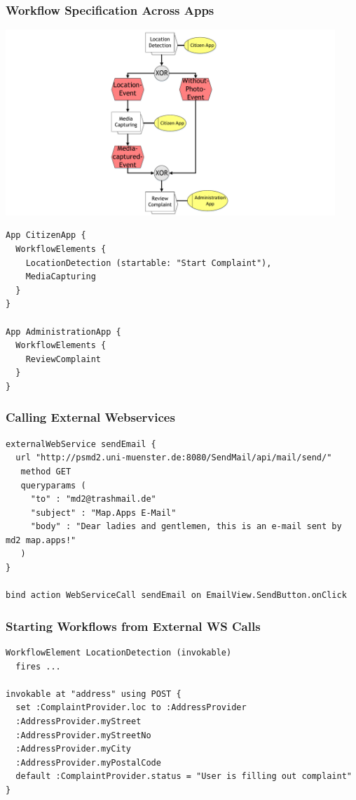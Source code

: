 \begin{frame}
	\plainnumber
	\frametitle{Workflow Specification Across Apps}
	
	\begin{minipage}{0.45\textwidth}
	    		        \includegraphics[height = 7cm, trim = 10cm 0cm 10cm 0cm, clip = true]{images/wfAcrossApps}	  
	\end{minipage}\hfill
	\begin{minipage}{0.5\textwidth}
\begin{lstlisting}
App CitizenApp {
  WorkflowElements {
    LocationDetection (startable: "Start Complaint"),
    MediaCapturing
  }
}

App AdministrationApp {
  WorkflowElements {
    ReviewComplaint
  }
}
\end{lstlisting}
\end{minipage}

\end{frame}


\begin{frame}[fragile]
	\frametitle{Calling External Webservices}
\begin{lstlisting}[basicstyle=\footnotesize\ttfamily]
externalWebService sendEmail {
  url "http://psmd2.uni-muenster.de:8080/SendMail/api/mail/send/"
   method GET
   queryparams (
     "to" : "md2@trashmail.de"
     "subject" : "Map.Apps E-Mail"
     "body" : "Dear ladies and gentlemen, this is an e-mail sent by md2 map.apps!"
   )
}
	
bind action WebServiceCall sendEmail on EmailView.SendButton.onClick
\end{lstlisting}
\end{frame}

\begin{frame}[fragile]
	\frametitle{Starting Workflows from External WS Calls}
\begin{lstlisting}[basicstyle=\footnotesize\ttfamily]
WorkflowElement LocationDetection (invokable)
  fires ...
		
invokable at "address" using POST {
  set :ComplaintProvider.loc to :AddressProvider
  :AddressProvider.myStreet
  :AddressProvider.myStreetNo
  :AddressProvider.myCity
  :AddressProvider.myPostalCode
  default :ComplaintProvider.status = "User is filling out complaint" 
}
\end{lstlisting}
\end{frame}



